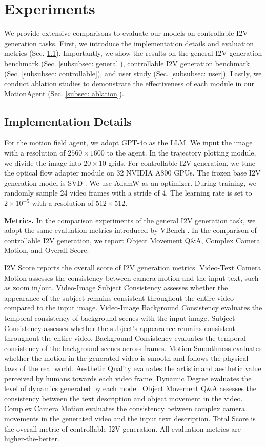 \section{Experiments}
\label{sec:experiments}
We provide extensive comparisons to evaluate our models on controllable I2V generation tasks. First, we introduce the implementation details and evaluation metrics (Sec. \ref{subsec: implementation}). Importantly, we show the results on the general I2V generation benchmark (Sec. \ref{subsubsec: general}), controllable I2V generation benchmark (Sec. \ref{subsubsec: controllable}), and user study (Sec. \ref{subsubsec: user}). Lastly, we conduct ablation studies to demonstrate the effectiveness of each module in our MotionAgent (Sec. \ref{subsec: ablation}).

\subsection{Implementation Details}
\label{subsec: implementation}
For the motion field agent, we adopt GPT-4o \cite{achiam2023gpt} as the LLM. We input the image with a resolution of $2560\times1600$ to the agent. In the trajectory plotting module, we divide the image into $20\times10$ grids. For controllable I2V generation, we tune the optical flow adapter module on 32 NVIDIA A800 GPUs. The frozen base I2V generation model is SVD \cite{blattmann2023stable}. We use AdamW as an optimizer. During training, we randomly sample 24 video frames with a stride of 4. The learning rate is set to $2\times10^{-5}$ with a resolution of $512\times512$.

\textbf{Metrics.} In the comparison experiments of the general I2V generation task, we adopt the same evaluation metrics introduced by VBench \cite{huang2024vbench}. In the comparison of controllable I2V generation, we report Object Movement Q\&A, Complex Camera Motion, and Overall Score.

I2V Score reports the overall score of I2V generation metrics. Video-Text Camera Motion assesses the consistency between camera motion and the input text, such as zoom in/out. Video-Image Subject Consistency assesses whether the appearance of the subject remains consistent throughout the entire video compared to the input image. Video-Image Background Consistency evaluates the temporal consistency of background scenes with the input image. Subject Consistency assesses whether the subject’s appearance remains consistent throughout the entire video. Background Consistency evaluates the temporal consistency of the background scenes across frames. Motion Smoothness evaluates whether the motion in the generated video is smooth and follows the physical laws of the real world. Aesthetic Quality evaluates the artistic and aesthetic value perceived by humans towards each video frame. Dynamic Degree evaluates the level of dynamics generated by each model. Object Movement Q\&A assesses the consistency between the text description and object movement in the video. Complex Camera Motion evaluates the consistency between complex camera movements in the generated video and the input text description. Total Score is the overall metric of controllable I2V generation. All evaluation metrics are higher-the-better.


